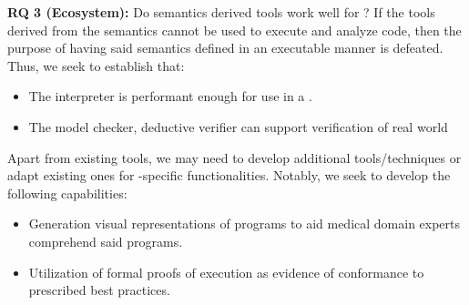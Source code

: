\textbf{RQ 3 (Ecosystem):} Do semantics derived tools work well for \CDSSs{}?
If the tools derived from the semantics cannot be used to execute and analyze
\CDSS{} code, then the purpose of having said semantics defined in an executable
manner is defeated. Thus, we seek to establish that:
\begin{itemize}
  \item The interpreter is performant enough for use in a \CDSS{}.
  \item The model checker, deductive verifier can support verification of real
    world \CDSSs{}
\end{itemize}
Apart from existing tools, we may need to develop additional tools/techniques or
adapt existing ones for  \CDSS{}-specific functionalities.
    Notably, we seek to develop the following capabilities:
\begin{itemize}
  \item Generation visual representations of programs to aid medical domain experts comprehend said programs.
  \item Utilization of formal proofs of execution as evidence of conformance to
    prescribed best practices.
\end{itemize}

